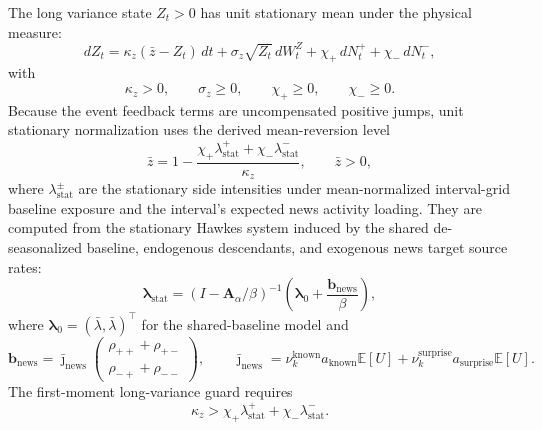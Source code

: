 \documentclass[11pt]{article}
\begin{document}
    The long variance state \(Z_t>0\) has unit stationary mean under the physical measure:
    \[
        dZ_t
        =
        \kappa_z(\bar z-Z_t)\,dt
        +\sigma_z\sqrt{Z_t}\,dW_t^Z
        +\chi_+\,dN_t^+
        +\chi_-\,dN_t^-,
    \]
    with
    \[
        \kappa_z>0,\qquad
        \sigma_z\ge0,\qquad
        \chi_+\ge0,\qquad
        \chi_-\ge0.
    \]
    Because the event feedback terms are uncompensated positive jumps, unit stationary
    normalization uses the derived mean-reversion level
    \[
        \bar z
        =
        1-
        \frac{
            \chi_+\lambda_{\mathrm{stat}}^+
            +\chi_-\lambda_{\mathrm{stat}}^-
        }{\kappa_z},
        \qquad
        \bar z>0,
    \]
    where \(\lambda_{\mathrm{stat}}^\pm\) are the stationary side intensities under
    mean-normalized interval-grid baseline exposure and the interval's expected news
    activity loading.
    They are computed from the stationary Hawkes system induced by the shared
    de-seasonalized baseline, endogenous descendants, and exogenous news target
    source rates:
    \[
        \boldsymbol{\lambda}_{\mathrm{stat}}
        =
        \left(I-\mathbf{A}_{\alpha}/\beta\right)^{-1}
        \left(
            \boldsymbol{\lambda}_0+\frac{\boldsymbol b_{\mathrm{news}}}{\beta}
        \right),
    \]
    where \(\boldsymbol{\lambda}_0=(\bar{\lambda},\bar{\lambda})^\top\) for the
    shared-baseline model and
    \[
        \boldsymbol b_{\mathrm{news}}
        =
        \bar{\jmath}_{\mathrm{news}}
        \begin{pmatrix}
            \rho_{++}+\rho_{+-}\\
            \rho_{-+}+\rho_{--}
        \end{pmatrix},
        \qquad
        \bar{\jmath}_{\mathrm{news}}
        =
        \nu_k^{\mathrm{known}}a_{\mathrm{known}}\mathbb E[U]
        +
        \nu_k^{\mathrm{surprise}}a_{\mathrm{surprise}}\mathbb E[U].
    \]
    The first-moment long-variance guard
    requires
    \[
        \kappa_z>
        \chi_+\lambda_{\mathrm{stat}}^+
        +
        \chi_-\lambda_{\mathrm{stat}}^-.
    \]
\end{document}
